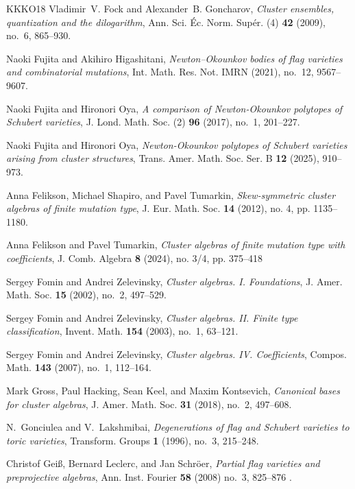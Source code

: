 \documentclass[11pt]{amsart}
\numberwithin{equation}{section}
\theoremstyle{plain}
\theoremstyle{definition}
\numberwithin{equation}{section}
\begin{document}
\begin{thebibliography}{KKKO18}
Vladimir~V. Fock and Alexander~B. Goncharov, \emph{Cluster ensembles,
  quantization and the dilogarithm}, Ann. Sci. \'{E}c. Norm. Sup\'{e}r. (4)  \textbf{42} (2009), no.~6, 865--930. 

Naoki Fujita and Akihiro Higashitani, \emph{Newton--{O}kounkov bodies of flag
  varieties and combinatorial mutations}, Int. Math. Res. Not. IMRN (2021),
  no.~12, 9567--9607.

Naoki Fujita and Hironori Oya, \emph{A comparison of {N}ewton-{O}kounkov
  polytopes of {S}chubert varieties}, J. Lond. Math. Soc. (2) \textbf{96}
  (2017), no.~1, 201--227.

Naoki Fujita and Hironori Oya,  \emph{Newton-{O}kounkov polytopes of {S}chubert varieties arising from
  cluster structures}, Trans. Amer. Math. Soc. Ser. B \textbf{12} (2025), 910--973.

Anna Felikson, Michael Shapiro, and Pavel Tumarkin, \emph{Skew-symmetric cluster algebras of finite mutation type}, J. Eur. Math. Soc. \textbf{14} (2012), no. 4, pp. 1135--1180.

Anna Felikson and Pavel Tumarkin, \emph{Cluster algebras of finite mutation
  type with coefficients}, J. Comb. Algebra \textbf{8} (2024), no. 3/4, pp. 375--418

Sergey Fomin and Andrei Zelevinsky, \emph{Cluster algebras. {I}.
  {F}oundations}, J. Amer. Math. Soc. \textbf{15} (2002), no.~2, 497--529.

Sergey Fomin and Andrei Zelevinsky, \emph{Cluster algebras. {II}.
  {F}inite type classification}, Invent. Math. \textbf{154} (2003), no.~1, 63--121.

Sergey Fomin and Andrei Zelevinsky, \emph{Cluster algebras. {IV}. {C}oefficients}, Compos. Math.
  \textbf{143} (2007), no.~1, 112--164. 

Mark Gross, Paul Hacking, Sean Keel, and Maxim Kontsevich, \emph{Canonical
  bases for cluster algebras}, J. Amer. Math. Soc. \textbf{31} (2018), no.~2,
  497--608. 

N.~Gonciulea and V.~Lakshmibai, \emph{Degenerations of flag and {S}chubert
  varieties to toric varieties}, Transform. Groups \textbf{1} (1996), no.~3,
  215--248. 


Christof Gei\ss, Bernard Leclerc, and Jan Schr\"{o}er, \emph{Partial flag varieties and preprojective algebras}, Ann. Inst. Fourier \textbf{58} (2008) no.~3, 825--876 .


\end{thebibliography}
\end{document}
